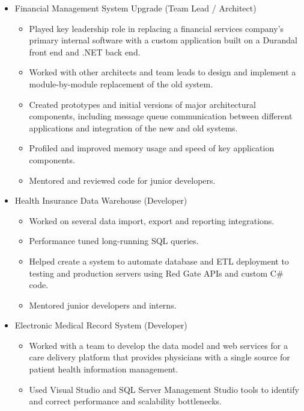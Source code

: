 \documentclass[12pt,letterpaper,sans]{moderncv}
\begin{document}
    \begin{itemize}[leftmargin=1.24in]
        \item Financial Management System Upgrade (Team Lead / Architect)
            \begin{itemize}
                \item Played key leadership role in replacing a financial services company's primary internal software with a custom application built on a Durandal front end and .NET back end.
                \item Worked with other architects and team leads to design and implement a module-by-module replacement of the old system.
                \item Created prototypes and initial versions of major architectural components, including message queue \mbox{communication} between different applications and integration of the new and old systems.
                \item Profiled and improved memory usage and speed of key application components.
                \item Mentored and reviewed code for junior developers.
            \end{itemize}
                                \newpage
        \item Health Insurance Data Warehouse (Developer)
        	\begin{itemize}
	        	\item Worked on several data import, export and reporting integrations.
	        	\item Performance tuned long-running SQL queries.
	        	\item Helped create a system to automate database and ETL deployment to testing and production servers using Red Gate APIs and custom C\# code.
	        	\item Mentored junior developers and interns.
        	\end{itemize}
        \item Electronic Medical Record System (Developer)
            \begin{itemize}
                \item Worked with a team to develop the data model and web services for a care delivery platform that provides physicians with a single source for patient health information management.
                \item Used Visual Studio and SQL Server Management Studio tools to identify and correct performance and scalability bottlenecks.

\end{itemize}
\end{itemize}
\end{document}
